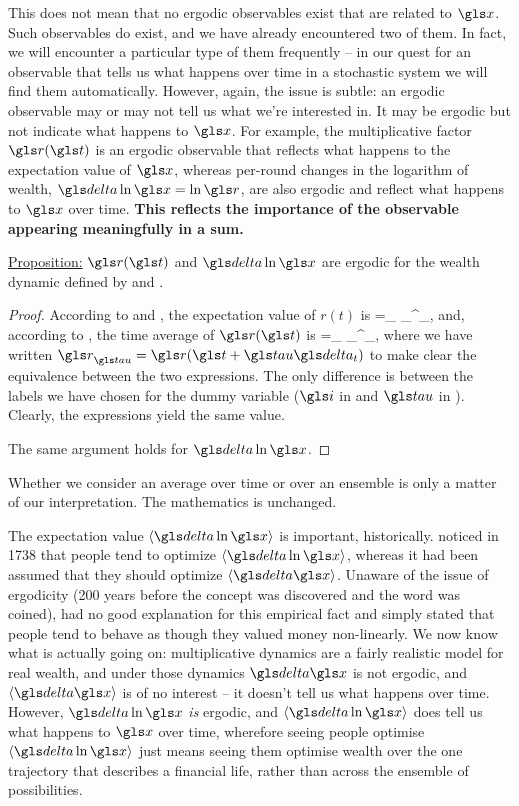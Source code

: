 This does not mean that no ergodic observables exist that are related to $\x$. Such observables do exist, and we have already encountered two of them. In fact, we will encounter a particular type
of them frequently -- in our quest for an observable that tells us what happens over time in a stochastic system we will find them automatically. However, again, the issue is subtle: an ergodic observable may or may not tell  us what we're interested in. It may be ergodic but not indicate what happens to $\x$. For example, the multiplicative factor $\gr(\t)$ is an ergodic observable that reflects what happens to the expectation value of $\x$, whereas per-round changes in the logarithm of wealth, $\d \ln \x = \ln \gr$, are also ergodic and reflect what happens to $\x$ over time. \textbf{This reflects the importance of the observable appearing meaningfully in a sum.}

\vspace{.3cm}
\underline{Proposition:} $\gr(\t)$ and $\d \ln \x$  are ergodic for the wealth dynamic defined by  and .

\begin{proof}
According to  and , the expectation value of $r(t)$ is
\be
\ave{\gr}=\lim_{\N\to\infty}  \sum_\gi^\N \gr_\gi,
\ee
and, according to , the time average of $\gr(\t)$ is
\be
\tave{\gr}=\lim_{\T\to\infty}  \sum_\gtau^\T \gr_\gtau,
\ee
where we have written $\gr_\gtau = \gr(\t+\gtau\dt)$ to make clear the equivalence between the two expressions. The only difference is between the labels we have chosen for the dummy variable ($\gi$ in  and $\gtau$ in ). Clearly, the expressions yield the same value. 

The same argument holds for $\d \ln \x$.
\end{proof}

Whether we consider  an average over time or over an ensemble is only a matter of our interpretation. The mathematics is unchanged.

The expectation value $\ave{\d \ln \x}$ is important, historically.  noticed in 1738 \cite{Bernoulli1738} that people tend to optimize $\ave{\d \ln \x}$, whereas it had been assumed that they should optimize $\ave{\d \x}$. Unaware of the issue of ergodicity (200 years before the concept was discovered and the word was coined),  had no good explanation for this empirical fact and simply stated that people tend to behave as though they valued money non-linearly. We now know what is actually going on: multiplicative dynamics are a fairly realistic model for real wealth, and under those dynamics $\d \x$ is not ergodic, and $\ave{\d \x}$ is of no interest -- it doesn't tell us what happens over time. However, $\d \ln \x$ {\it is} ergodic, and $\ave{\d \ln \x}$ does tell us what happens to $\x$ over time, wherefore seeing people optimise $\ave{\d \ln \x}$ just means seeing them optimise wealth over the one trajectory that describes a financial life, rather than across the ensemble of possibilities.

